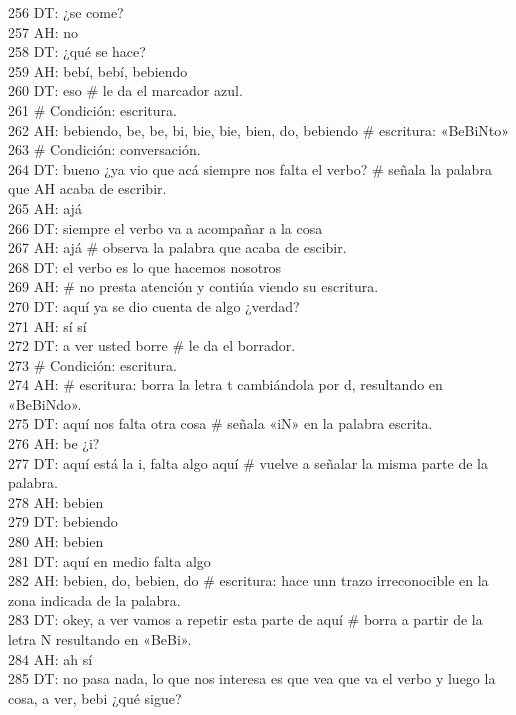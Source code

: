 256 DT: ¿se come?\\
257 AH: no\\
258 DT: ¿qué se hace?\\
259 AH: bebí, bebí, bebiendo\\
260 DT: eso \# le da el marcador azul.\\
261 \# Condición: escritura.\\
262 AH: bebiendo, be, be, bi, bie, bie, bien, do, bebiendo \# escritura: «BeBiNto»\\
263 \# Condición: conversación.\\
264 DT: bueno ¿ya vio que acá siempre nos falta el verbo? \# señala la palabra que AH acaba de escribir.\\
265 AH: ajá\\
266 DT: siempre el verbo va a acompañar a la cosa\\
267 AH: ajá \# observa la palabra que acaba de escibir.\\
268 DT: el verbo es lo que hacemos nosotros\\
269 AH: \# no presta atención y contiúa viendo su escritura.\\
270 DT: aquí ya se dio cuenta de algo ¿verdad?\\
271 AH: sí sí\\
272 DT: a ver usted borre \# le da el borrador.\\
273 \# Condición: escritura.\\
274 AH: \# escritura: borra la letra t cambiándola por d, resultando en «BeBiNdo».\\
275 DT: aquí nos falta otra cosa \# señala «iN» en la palabra escrita.\\
276 AH: be ¿i?\\
277 DT: aquí está la i, falta algo aquí \# vuelve a señalar la misma parte de la palabra.\\
278 AH: bebien\\
279 DT: bebiendo\\
280 AH: bebien\\
281 DT: aquí en medio falta algo\\
282 AH: bebien, do, bebien, do \# escritura: hace unn trazo irreconocible en la zona indicada de la palabra.\\
283 DT: okey, a ver vamos a repetir esta parte de aquí \# borra a partir de la letra N resultando en «BeBi».\\
284 AH: ah sí\\
285 DT: no pasa nada, lo que nos interesa es que vea que va el verbo y luego la cosa, a ver, bebi ¿qué sigue?\\
